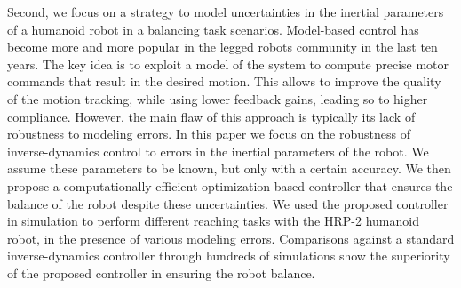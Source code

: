 \documentclass[english,a4paper,10pt,twoside]{StyleThese}
\begin{document}
\begin{vcenterpage}
 Second, we focus on a strategy to model uncertainties in the inertial parameters of a humanoid robot in a balancing task scenarios. Model-based control has become more and more popular in the legged robots community in the last ten years. The key idea is to exploit a model of the system to compute precise motor commands that result in the desired motion. This allows to improve the quality of the motion tracking, while using lower feedback gains, leading so to higher compliance. However, the main flaw of this approach is typically its lack of robustness to modeling errors. In this paper we focus on the robustness of inverse-dynamics control to errors in the inertial parameters of the robot. We assume these parameters to be known, but only with a certain accuracy. We then propose a computationally-efficient optimization-based controller that ensures the balance of the robot despite these uncertainties. We used the proposed controller in simulation to perform different reaching tasks with the HRP-2 humanoid robot, in the presence of various modeling errors. Comparisons against a standard inverse-dynamics controller through hundreds of simulations show the superiority of the proposed controller in ensuring the robot balance.
\end{vcenterpage}

\tableofcontents
\printnomenclature
\mtcfixnomenclature
\mainmatter
% 

% 
% 
% 


%


\end{document}
